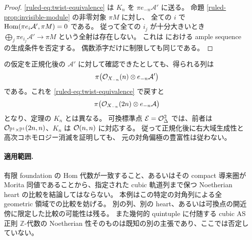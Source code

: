 \begin{proof}
\eqref{ruled-eq:twist-equivalence} は $K_n$ を $\pi e_{-n}\mathcal A'$ に送る。
命題 \ref{ruled-prop:invisible-module} の非零対象 $\pi M$ に対し、
全ての $i$ で $\operatorname{Hom}(\pi e_i\mathcal A',\pi M)=0$ である。
従って全ての $i_j$ が十分大きいとき
$\bigoplus_j\pi e_{i_j}\mathcal A'\to\pi M$ という全射は存在しない。
これは \cite[\S8.1 の (A1)]{VanDenBergh2012P1} における ample sequence の生成条件を否定する。
偶数添字だけに制限しても同じである。
\end{proof}

\begin{remark}[正規化後の強豊富性との両立]
\cite[Lemma 8.1.1]{VanDenBergh2012P1} の仮定を正規化後の $\mathcal A'$ に対して確認できたとしても、得られる列は
\[
 \pi\bigl(\mathcal O_{X_{-n}}(n)\otimes e_{-n}\mathcal A'\bigr)
\]
である。これを \eqref{ruled-eq:twist-equivalence} で戻すと
\[
 \pi\bigl(\mathcal O_{X_{-n}}(2n)\otimes e_{-n}\mathcal A\bigr)
\]
となり、定理の $K_n$ とは異なる。
可換標準点 $\mathcal E=\mathcal O_\Delta^2$ では、前者は
$\mathcal O_{\mathbb P^1\times\mathbb P^1}(2n,n)$、$K_n$ は $\mathcal O(n,n)$ に対応する。
従って正規化後に右大域生成性と高次コホモロジー消滅を証明しても、
元の対角偏極の豊富性は従わない。
\end{remark}

\paragraph{適用範囲.}
有限 foundation の Hom 代数が一致すること、あるいはその compact 導来圏が
Morita 同値であることから、指定された cubic 軌道列まで保つ
Noetherian heart の比較を結論してはならない。
本例はこの特定の対角列による全 geometric 領域での比較を妨げる。
別の列、別の heart、あるいは可換点の開近傍に限定した比較の可能性は残る。
また幾何的 quintuple に付随する cubic AS 正則 $\mathbb Z$-代数の
Noetherian 性そのものは既知の別の主張であり、ここでは否定していない。

